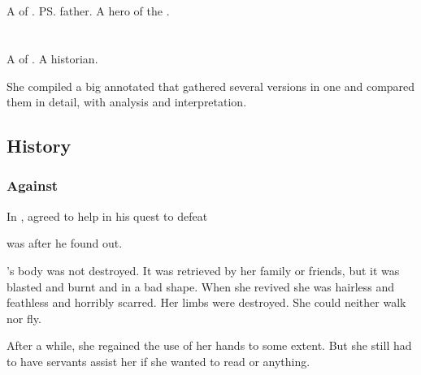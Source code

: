 \section{\Tuerdal}
\index{\Tuerdal}
A \ketheran{} \resphan{} of \CiriathSepher. 
\ps{\Teshrial} father. 
A hero of the . 















\section{\Urizeth}
\index{\Urizeth}
A \thelyad{} \resvil{} of \CiriathSepher. 
A historian. 

She compiled a big annotated \emph{} that gathered several versions in one and compared them in detail, with analysis and interpretation. 









\subsection{History}





\subsubsection{Against \Ishnaruchaefir}
In \TwilightAngelRememberEmph, \Urizeth agreed to help \Teshrial in his quest to defeat \QuessanthIshnaruchaefir

\Urizeth was  after he found out. 

\Urizeth's body was not destroyed.
It was retrieved by her family or friends, but it was blasted and burnt and in a bad shape.
When she revived she was hairless and feathless and horribly scarred. 
Her limbs were destroyed. 
She could neither walk nor fly. 

After a while, she regained the use of her hands to some extent.
But she still had to have servants assist her if she wanted to read or anything. 


